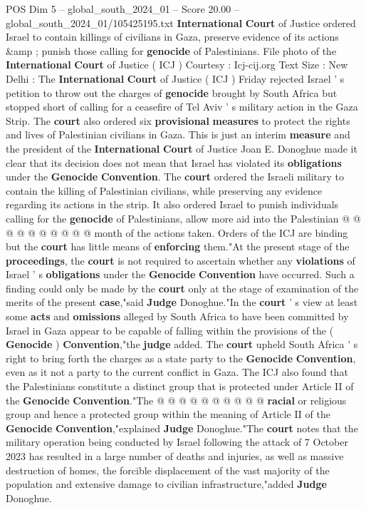 \begin{textsample}{POS Dim 5 – global\_south\_2024\_01 – Score 20.00 – global\_south\_2024\_01/105425195.txt}  \label{ex:f5_pos_017}
\textbf{International} \textbf{Court} of Justice ordered Israel to contain killings of civilians in Gaza, preserve evidence of its actions \&amp ; punish those calling for \textbf{genocide} of Palestinians.
File photo of the \textbf{International} \textbf{Court} of Justice ( ICJ ) Courtesy : Icj-cij.org Text Size : New Delhi : The \textbf{International} \textbf{Court} of Justice ( ICJ ) Friday rejected Israel ' s petition to throw out the charges of \textbf{genocide} brought by South Africa but stopped short of calling for a ceasefire of Tel Aviv ' s military action in the Gaza Strip.
The \textbf{court} also ordered six \textbf{provisional} \textbf{measures} to protect the rights and lives of Palestinian civilians in Gaza.
This is just an interim \textbf{measure} and the president of the \textbf{International} \textbf{Court} of Justice Joan E.
Donoghue made it clear that its decision does not mean that Israel has violated its \textbf{obligations} under the \textbf{Genocide} \textbf{Convention}.
The \textbf{court} ordered the Israeli military to contain the killing of Palestinian civilians, while preserving any evidence regarding its actions in the strip.
It also ordered Israel to punish individuals calling for the \textbf{genocide} of Palestinians, allow more aid into the Palestinian @ @ @ @ @ @ @ @ @ @ month of the actions taken.
Orders of the ICJ are binding but the \textbf{court} has little means of \textbf{enforcing} them."At the present stage of the \textbf{proceedings}, the \textbf{court} is not required to ascertain whether any \textbf{violations} of Israel ' s \textbf{obligations} under the \textbf{Genocide} \textbf{Convention} have occurred.
Such a finding could only be made by the \textbf{court} only at the stage of examination of the merits of the present \textbf{case},"said \textbf{Judge} Donoghue."In the \textbf{court} ' s view at least some \textbf{acts} and \textbf{omissions} alleged by South Africa to have been committed by Israel in Gaza appear to be capable of falling within the provisions of the ( \textbf{Genocide} ) \textbf{Convention},"the \textbf{judge} added.
The \textbf{court} upheld South Africa ' s right to bring forth the charges as a state party to the \textbf{Genocide} \textbf{Convention}, even as it not a party to the current conflict in Gaza.
The ICJ also found that the Palestinians constitute a distinct group that is protected under Article II of the \textbf{Genocide} \textbf{Convention}."The @ @ @ @ @ @ @ @ @ @ \textbf{racial} or religious group and hence a protected group within the meaning of Article II of the \textbf{Genocide} \textbf{Convention},"explained \textbf{Judge} Donoghue."The \textbf{court} notes that the military operation being conducted by Israel following the attack of 7 October 2023 has resulted in a large number of deaths and injuries, as well as massive destruction of homes, the forcible displacement of the vast majority of the population and extensive damage to civilian infrastructure,"added \textbf{Judge} Donoghue.

\end{textsample}

